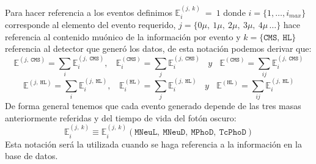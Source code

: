 Para hacer referencia a los eventos definimos $\mathbb{E}_i^{(j,~k)} ~ = ~1$ donde $i = \{1, \ldots, i_{max}\}$ corresponde al elemento del evento requerido, $j = \{0\mu, ~1\mu, ~2\mu, ~3\mu, ~4\mu\, \ldots\}$ hace referencia al contenido muónico de la información por evento y $k = \{\mathtt{CMS},~\mathtt{HL}\}$ referencia al detector que generó los datos, de esta notación podemos derivar que:
\begin{equation}
\mathbb{E}^{(j,~\mathtt{CMS})} = \sum_i \mathbb{E}_i^{(j, ~\mathtt{CMS})} , ~~~~ \mathbb{E}_i^{(\mathtt{CMS})} = \sum_j \mathbb{E}_i^{(j,~\mathtt{CMS})} ~~~~ y ~~~~ \mathbb{E}^{(\mathtt{CMS})}= \sum_{ij} \mathbb{E}_i^{(j,~\mathtt{CMS})}
\end{equation}
\begin{equation}
\mathbb{E}^{(j,~\mathtt{HL})} = \sum_i \mathbb{E}_i^{(j, ~\mathtt{HL})} , ~~~~ \mathbb{E}_i^{(\mathtt{HL})} = \sum_j \mathbb{E}_i^{(j,~\mathtt{HL})} ~~~~ y ~~~~ \mathbb{E}^{(\mathtt{HL})}= \sum_{ij} \mathbb{E}_i^{(j,~\mathtt{HL})}
\end{equation}
De forma general tenemos que cada evento generado depende de las tres masas anteriormente referidas y del tiempo de vida del fotón oscuro:
\begin{equation}
\mathbb{E}_i^{(j,~k)} \equiv \mathbb{E}_i^{(j,~k)}\mathtt{(MNeuL,~MNeuD,~MPhoD,~TcPhoD)}
\end{equation}
Esta notación será la utilizada cuando se haga referencia a la información en la base de datos.




















